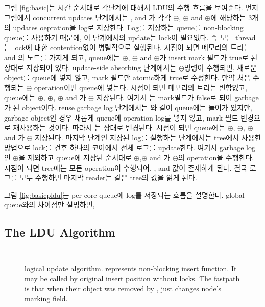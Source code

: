 그림 \ref{fig:basic}는 시간 순서대로 각단계에 대해서 LDU의 수행 흐름을 보여준다.
먼저 그림에서 concurrent updates 단계에서는 ,  and 가 각각
$\oplus$, $\oplus$ and
$\oplus$에 해당하는 3개의 updates oepration을 log로 저장한다. 
Log를 저장하는 queue를 non-blocking queue를 사용하기 때문에, 이 단계에서의 update는 lock이 필요없다. 
즉 모든 thread는 lock에 대한 contention없이 병렬적으로 실행된다. 
 시점이 되면 메모리의 트리는  and 의 노드를 가지게 되고, queue에는 
$\oplus$, $\oplus$ and $\oplus$가 insert mark 필드가
true로 된 상태로 저장되어 있다. 
update-side absorbing 단계에서는  $\ominus$명령이 수행되면, 새로운 object를 queue에 넣지
않고, mark 필드만 atomic하게 true로 수정한다.  
만약 처음 수행되는 $\ominus$ operation이면 queue에 넣는다.
 시점이 되면 메모리의 트리는 변함없고, queue에는 
$\oplus$, $\oplus$, $\oplus$ and 가
$\ominus$ 저장된다. 여기서 는 mark필드가 false로 되어 garbage가 된 object이다.
reuse garbage log 단계에서는 와 같이 queue에는 들어가 있지만, garbage object인 경우 새롭게
queue에 operation log를 넣지 않고, mark 필드 변경으로 재사용하는 것이다. 
따라서 는  상태로 변경된다. 
 시점이 되면 queue에는 
$\oplus$, $\oplus$, $\oplus$ and 가
$\ominus$ 저장된다.
마지막 단계인 저장된 log를 실행하는 단계에서는 tree에서 사용한 방법으로 lock를 건후 하나의 코어에서 
전체 로그를 update한다. 여기서 garbage log인  $\oplus$을 제외하고 queue에 저장된 순서대로 
$\oplus$,$\oplus$ and 가 $\ominus$의 operation을
수행한다.  시점이 되면 tree에는 
모든 operation이 수행되어, ,  and  값이 존재하게 된다.
결국 로그를 모두 수행하면 마지막 reader는 같은 tree의 값을 읽게 된다. 

그림 \ref{fig:basicpldu}는 per-core queue에 log를 저장되는 흐름을 설명한다.
global queue와의 차이점만 설명하면,


\else

\fi

\subsection{The LDU Algorithm}
\begin{figure}[tb!]
\inputminted[linenos,fontsize=\footnotesize, tabsize=2]{c}{src/ldu_logical.c}
\rule{\columnwidth}{0.5pt}
\vspace{-\baselineskip}
\caption{ logical update algorithm.  represents
 non-blocking insert function.
It may be called by original insert position without locks. The fastpath is
 that when their object was removed by ,
  just changes node's marking field.}
\label{fig:gldulogicalupdate}
\end{figure}

